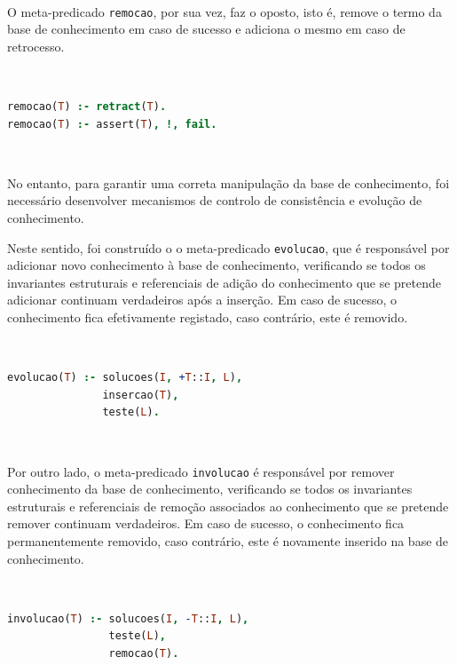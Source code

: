 \documentclass[a4paper, 11pt]{article}
\begin{document}
\

O meta-predicado \texttt{remocao}, por sua vez, faz o oposto, isto é, remove o termo da base de conhecimento em caso de
sucesso e adiciona o mesmo em caso de retrocesso.

\

\begin{lstlisting}[language=Prolog, caption={Extensão do meta-predicado \texttt{remocao}}]
% Extensao do meta-predicado remocao: T -> {V, F}
remocao(T) :- retract(T).
remocao(T) :- assert(T), !, fail.
\end{lstlisting}

\

No entanto, para garantir uma correta manipulação da base de conhecimento, foi necessário desenvolver mecanismos de controlo
de consistência e evolução de conhecimento. 

Neste sentido, foi construído o o meta-predicado \texttt{evolucao}, que é responsável por adicionar novo conhecimento à
base de conhecimento, verificando se todos os invariantes estruturais e referenciais de adição do conhecimento que se
pretende adicionar continuam verdadeiros após a inserção. Em caso de sucesso, o conhecimento fica efetivamente registado,
caso contrário, este é removido.

\

\begin{lstlisting}[language=Prolog, caption={Extensão do meta-predicado \texttt{evolucao}}]
% Extensao do meta-predicado evolucao: T -> {V, F}
evolucao(T) :- solucoes(I, +T::I, L),
               insercao(T),
               teste(L).
\end{lstlisting}

\

Por outro lado, o meta-predicado \texttt{involucao} é responsável por remover conhecimento da base de conhecimento, verificando
se todos os invariantes estruturais e referenciais de remoção associados ao conhecimento que se pretende remover continuam
verdadeiros. Em caso de sucesso, o conhecimento fica permanentemente removido, caso contrário, este é novamente inserido
na base de conhecimento.

\

\begin{lstlisting}[language=Prolog, caption={Extensão do meta-predicado \texttt{involucao}}]
% Extensao do meta-predicado involucao: T -> {V, F}
involucao(T) :- solucoes(I, -T::I, L),
                teste(L),
                remocao(T).
\end{lstlisting}
\end{document}
